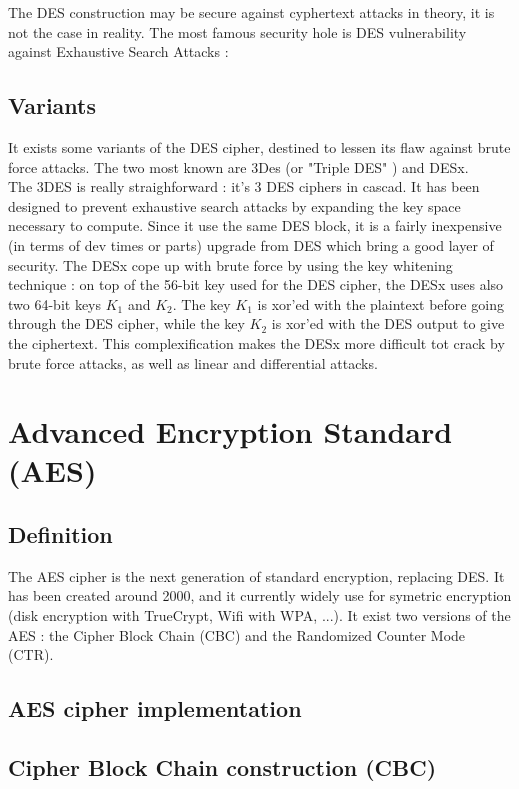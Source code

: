 The DES construction may be secure against cyphertext attacks in theory, it is not the case in reality. The most famous security hole is DES vulnerability against Exhaustive Search Attacks : 	

\subsection{Variants}

It exists some variants of the DES cipher, destined to lessen its flaw against brute force attacks. The two most known are 3Des (or "Triple DES" ) and DESx. \\
The 3DES is really straighforward : it's 3 DES ciphers in cascad. It has been designed to prevent exhaustive search attacks by expanding the key space necessary to compute. Since it use the same DES block, it is a fairly inexpensive (in terms of dev times or parts) upgrade from DES which bring a good layer of security.
The DESx cope up with brute force by using the key whitening technique : on top of the 56-bit key used for the DES cipher, the DESx uses also two 64-bit keys $K_1$ and $K_2$. The key $K_1$ is xor'ed with the plaintext before going through the DES cipher, while the key $K_2$ is xor'ed with the DES output to give the ciphertext. This complexification makes the DESx more difficult tot crack by brute force attacks, as well as linear and differential attacks.

\section{Advanced Encryption Standard (AES)}

\subsection{Definition}

The AES cipher is the next generation of standard encryption, replacing DES. It has been created around 2000, and it currently widely use for symetric encryption (disk encryption with TrueCrypt, Wifi with WPA, ...). It exist two versions of the AES : the Cipher Block Chain (CBC) and the Randomized Counter Mode (CTR). 

\subsection{ AES cipher implementation }


\subsection{Cipher Block Chain construction (CBC)}



